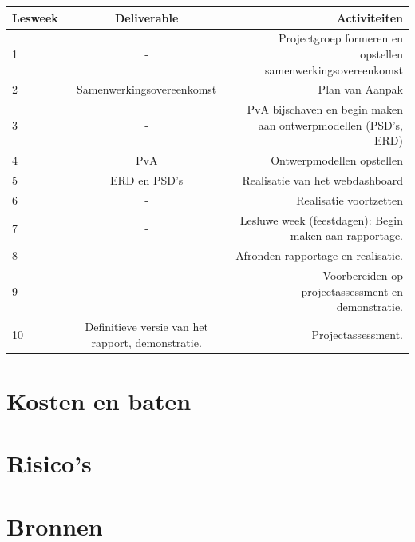 \documentclass[11pt]{article}
\begin{document}
\begin{adjustbox}{width=\textwidth}
\begin{tabular}{|l | c | r |}
	\hline
	Lesweek & Deliverable & Activiteiten \\ \hline
	1 & -	& Projectgroep formeren en opstellen samenwerkingsovereenkomst \\ \hline
	2 & Samenwerkingsovereenkomst & Plan van Aanpak\\ \hline
	3 & - & PvA bijschaven en begin maken aan ontwerpmodellen
	(PSD’s, ERD)\\ \hline
	4 & PvA & Ontwerpmodellen opstellen\\ \hline
	5 & ERD en PSD's & Realisatie van het webdashboard\\ \hline
	6 & - & Realisatie voortzetten\\ \hline
	7 & - & Lesluwe week (feestdagen): Begin maken aan rapportage.\\ \hline
	8 & - & Afronden rapportage en realisatie.\\ \hline
	9 & - & Voorbereiden op projectassessment en demonstratie.\\ \hline
	10 & Definitieve versie van	het rapport, demonstratie.&
Projectassessment.\\ \hline
	
\end{tabular}
\end{adjustbox}
\newpage
\section{Kosten en baten}
\newpage
\section{Risico's}
\newpage
\section{Bronnen}
\newpage
\end{document}
